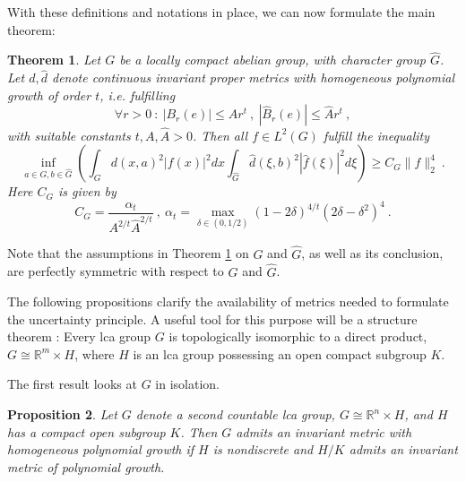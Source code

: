 \documentclass[12pt, reqno]{amsart}
\newtheorem{theorem}{Theorem}
\newtheorem{proposition}[theorem]{Proposition}
\begin{document}
With these definitions and notations in place, we can now formulate the main theorem: 
\begin{theorem} \label{thm:main}
Let $G$ be a locally compact abelian group, with character group $\widehat{G}$. Let $d,\widehat{d}$ denote continuous invariant proper metrics with homogeneous polynomial growth of order $t$, i.e. fulfilling
\[
\forall r > 0~:~ |B_r(e)| \le A r^t ~,~ |\widehat{B}_r(e)| \le \widehat{A} r^t~,
\] with suitable constants $t,A, \widehat{A}>0$. Then all $f \in L^2(G)$ fulfill the inequality \begin{equation} \label{eqn:Heisenberg}
\inf_{a \in G, b \in \widehat{G}} \left( \int_G d(x,a)^2 |f(x)|^2 dx \int_{\widehat{G}} \widehat{d}(\xi,b)^2 |\widehat{f}(\xi)|^2 d\xi \right) \ge C_G \|f\|_2^4~.
\end{equation}
Here $C_G$ is given by 
\begin{equation} \label{eqn:def_C_G}
C_G = \frac{\alpha_t}{A^{2/t} \widehat{A}^{2/t}}~,~ \alpha_t = \max_{\delta \in (0,1/2)} (1-2 \delta)^{4/t} (2 \delta - \delta^2)^4~.
\end{equation}
\end{theorem}

Note that the assumptions in Theorem \ref{thm:main} on $G$ and $\widehat{G}$, as well as its conclusion, are perfectly symmetric with respect to $G$ and $\widehat{G}$.

The following propositions clarify the availability of metrics needed to formulate the uncertainty principle. A useful tool for this purpose will be a structure theorem \cite[Corollary 3]{MR564688}: Every lca group $G$ is topologically isomorphic to a direct product, $G \cong \mathbb{R}^m \times H$, where $H$ is an lca group possessing an open compact subgroup $K$.

The first result looks at $G$ in isolation. 
\begin{proposition} \label{prop:ex_metric}
Let $G$ denote a second countable lca group, $G \cong \mathbb{R}^n \times H$, and $H$ has a compact open subgroup $K$. Then $G$ admits an invariant metric with homogeneous polynomial growth if $H$ is nondiscrete and $H/K$ admits an invariant metric of polynomial growth.
\end{proposition}
\end{document}
